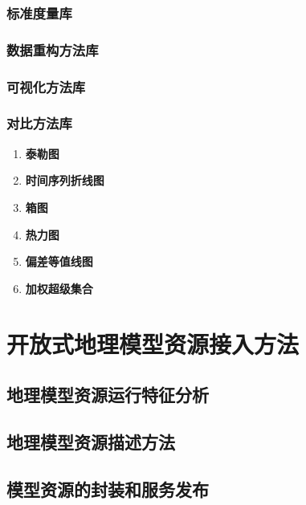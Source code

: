 \subsubsection{标准度量库}
\subsubsection{数据重构方法库}
\subsubsection{可视化方法库}
\subsubsection{对比方法库}
\begin{enumerate}[(1)]
\item \textbf{泰勒图}

\item \textbf{时间序列折线图}

\item \textbf{箱图}

\item \textbf{热力图}

\item \textbf{偏差等值线图}

\item \textbf{加权超级集合}

\end{enumerate}

\section{开放式地理模型资源接入方法}

\subsection{地理模型资源运行特征分析}

\subsection{地理模型资源描述方法}
\subsection{模型资源的封装和服务发布}

